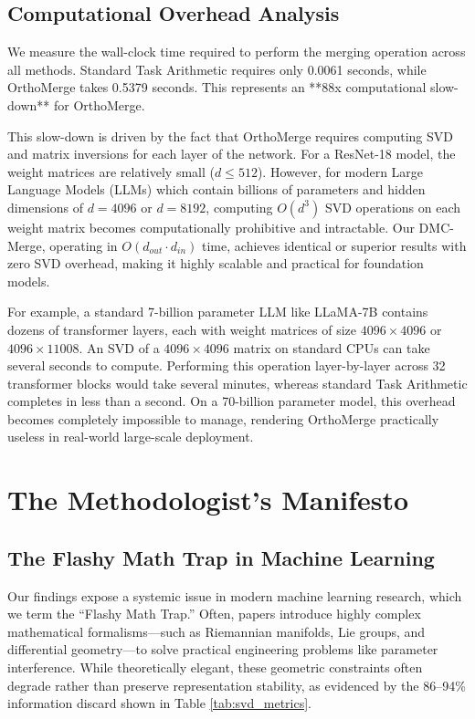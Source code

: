 \documentclass{article}
\begin{document}
\subsection{Computational Overhead Analysis}
We measure the wall-clock time required to perform the merging operation across all methods. Standard Task Arithmetic requires only 0.0061 seconds, while OrthoMerge takes 0.5379 seconds. This represents an **88x computational slow-down** for OrthoMerge. 

This slow-down is driven by the fact that OrthoMerge requires computing SVD and matrix inversions for each layer of the network. For a ResNet-18 model, the weight matrices are relatively small ($d \le 512$). However, for modern Large Language Models (LLMs) which contain billions of parameters and hidden dimensions of $d = 4096$ or $d = 8192$, computing $O(d^3)$ SVD operations on each weight matrix becomes computationally prohibitive and intractable. Our DMC-Merge, operating in $O(d_{out} \cdot d_{in})$ time, achieves identical or superior results with zero SVD overhead, making it highly scalable and practical for foundation models.

For example, a standard 7-billion parameter LLM like LLaMA-7B contains dozens of transformer layers, each with weight matrices of size $4096 \times 4096$ or $4096 \times 11008$. An SVD of a $4096 \times 4096$ matrix on standard CPUs can take several seconds to compute. Performing this operation layer-by-layer across 32 transformer blocks would take several minutes, whereas standard Task Arithmetic completes in less than a second. On a 70-billion parameter model, this overhead becomes completely impossible to manage, rendering OrthoMerge practically useless in real-world large-scale deployment.

\section{The Methodologist's Manifesto}
\label{manifesto}

\subsection{The Flashy Math Trap in Machine Learning}
Our findings expose a systemic issue in modern machine learning research, which we term the ``Flashy Math Trap.'' Often, papers introduce highly complex mathematical formalisms—such as Riemannian manifolds, Lie groups, and differential geometry—to solve practical engineering problems like parameter interference. While theoretically elegant, these geometric constraints often degrade rather than preserve representation stability, as evidenced by the 86--94\% information discard shown in Table \ref{tab:svd_metrics}. 
\end{document}
